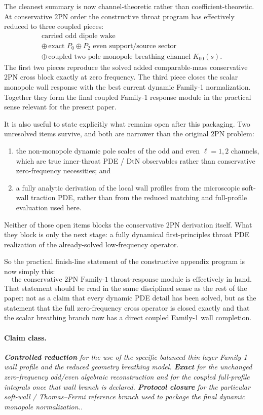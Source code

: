 \documentclass[11pt]{article}
\newcommand{\TwoPN}{\mathrm{2PN}}
\newcommand{\DtN}{\mathrm{DtN}}
\newcommand{\Exact}{\textbf{Exact}}
\newcommand{\Controlled}{\textbf{Controlled reduction}}
\newcommand{\Protocol}{\textbf{Protocol closure}}
\newcommand{\claimclass}[1]{\paragraph{Claim class.}\emph{#1.}}
\begin{document}
The cleanest summary is now channel-theoretic rather than coefficient-theoretic.
At conservative \(\TwoPN\) order the constructive throat program has effectively reduced to
three coupled pieces:
\begin{equation}
\boxed{
\begin{gathered}
\text{carried odd dipole wake}\\
\oplus\,\text{exact }P_0\oplus P_2\text{ even support/source sector}\\
\oplus\,\text{coupled two-pole monopole breathing channel }K_{00}(s).
\end{gathered}
}
\label{eq:family1-final-boxed-summary}
\end{equation}
The first two pieces reproduce the solved added comparable-mass conservative \(\TwoPN\)
cross block exactly at zero frequency.
The third piece closes the scalar monopole wall response with the best current dynamic
Family-1 normalization.
Together they form the final coupled Family-1 response module in the practical sense
relevant for the present paper.

It is also useful to state explicitly what remains open after this packaging.
Two unresolved items survive, and both are narrower than the original \(\TwoPN\) problem:
\begin{enumerate}[leftmargin=1.5em]
  \item the non-monopole dynamic pole scales of the odd and even
  \(\ell=1,2\) channels, which are true inner-throat PDE / \(\DtN\) observables rather
  than conservative zero-frequency necessities; and
  \item a fully analytic derivation of the local wall profiles from the microscopic
  soft-wall traction PDE, rather than from the reduced matching and full-profile
  evaluation used here.
\end{enumerate}
Neither of those open items blocks the conservative \(\TwoPN\) derivation itself.
What they block is only the next stage: a fully dynamical first-principles throat PDE
realization of the already-solved low-frequency operator.

So the practical finish-line statement of the constructive appendix program is now simply
this:
\begin{equation}
\boxed{
\text{the conservative }\TwoPN\text{ Family-1 throat-response module is effectively in hand.}
}
\label{eq:family1-final-practical-finish-line}
\end{equation}
That statement should be read in the same disciplined sense as the rest of the paper: not
as a claim that every dynamic PDE detail has been solved, but as the statement that the
full zero-frequency cross operator is closed exactly and that the scalar breathing branch
now has a direct coupled Family-1 wall completion.

\claimclass{\Controlled{} for the use of the specific balanced thin-layer Family-1 wall
profile and the reduced geometry breathing model.
\Exact{} for the unchanged zero-frequency odd/even algebraic reconstruction and for the
coupled full-profile integrals once that wall branch is declared.
\Protocol{} for the particular soft-wall / Thomas--Fermi reference branch used to package
the final dynamic monopole normalization.}
\end{document}
